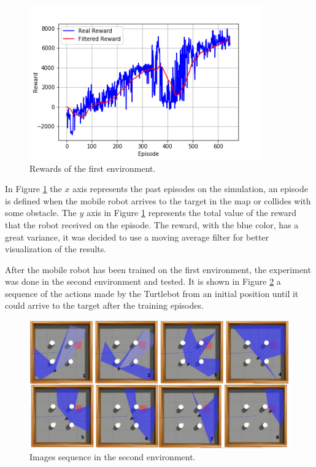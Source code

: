 \begin{figure}[H]
\centerline{\includegraphics[width=10cm]{images/stage_1.png}}
\caption{Rewards of the first environment.}
\label{fig:stage_1}
\end{figure}

In {\color{blue}Figure} \ref{fig:stage_1} the $x$ axis represents the past episodes on the simulation, an episode is defined when the mobile robot arrives to the target in the map or collides with some obstacle. 
The $y$ axis in {\color{blue}Figure} \ref{fig:stage_1} represents the total value of the reward that the robot received on the episode.
The reward, with the blue color, has a great variance, it was decided to use a moving average filter for better visualization of the results.

After the mobile robot has been trained on the first environment, the experiment was done in the second environment and tested. It is shown in {\color{blue}Figure} \ref{fig:amb2target} a sequence of the actions made by the Turtlebot from an initial position until it could arrive to the target after the training episodes.

\begin{figure}[H]
\centerline{\includegraphics[width=\columnwidth]{images/amb2target.png}}
\caption{Images sequence in the second environment.}
\label{fig:amb2target}
\end{figure}

